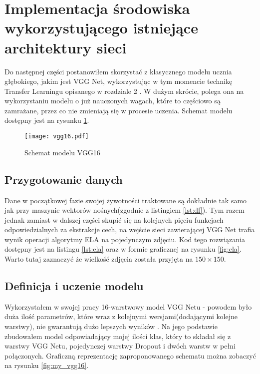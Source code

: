 \section{Implementacja środowiska wykorzystującego istniejące architektury sieci}

Do następnej części postanowiłem skorzystać z klasycznego modelu ucznia głębokiego, jakim jest VGG Net, wykorzystując w tym momencie technikę Transfer Learningu opisanego w rozdziale 2 . W dużym skrócie, polega ona na wykorzystaniu modelu o już nauczonych wagach, które to częściowo są zamrażane, przez co nie zmieniają się w procesie uczenia. Schemat modelu dostępny jest na rysunku \ref{fig:vgg16}.  \\

\begin{figure}[h!]
	\texttt{[image: vgg16.pdf]}
	\centering
	\caption{Schemat modelu VGG16}
	\label{fig:vgg16}
\end{figure}

\subsection{Przygotowanie danych}

Dane w początkowej fazie swojej żywotności traktowane są dokładnie tak samo jak przy maszynie wektorów nośnych(zgodnie z listingiem \ref{lst:df}). Tym razem jednak zamiast w dalszej części skupić się na kolejnych pięciu funkcjach odpowiedzialnych za ekstrakcje cech, na wejście sieci zawierającej VGG Net trafia wynik operacji algorytmy ELA na pojedynczym zdjęciu. Kod tego rozwiązania dostępny jest na listingu \ref{lst:ela} oraz w formie graficznej na rysunku \ref{fig:ela}. Warto tutaj zaznaczyć że wielkość zdjęcia została przyjęta na $150 \times 150$.

\subsection{Definicja i uczenie modelu}

Wykorzystałem  w swojej pracy 16-warstwowy model VGG Netu - powodem było duża ilość parametrów, które wraz z kolejnymi wersjami(dodającymi kolejne warstwy), nie gwarantują dużo lepszych wyników \cite{vgg}. Na jego podstawie zbudowałem model odpowiadający mojej ilości klas, który to składał się z warstwy VGG Netu, pojedynczej warstwy Dropout i dwóch warstw w pełni połączonych. Graficzną reprezentację zaproponowanego schematu można zobaczyć na rysunku \ref{fig:my_vgg16}.

